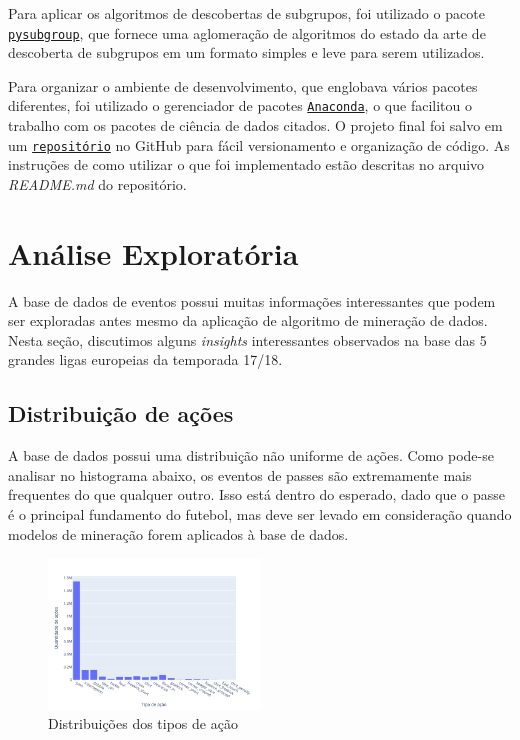\documentclass{article}
\begin{document}
Para aplicar os algoritmos de descobertas de subgrupos, foi utilizado o pacote
\href{https://pysubgroup.readthedocs.io/en/latest/}{\texttt{pysubgroup}}, que
fornece uma aglomeração de algoritmos do estado da arte de descoberta de
subgrupos em um formato simples e leve para serem utilizados.


Para organizar o ambiente de desenvolvimento, que englobava vários pacotes
diferentes, foi utilizado o gerenciador de pacotes
\href{https://www.anaconda.com/}{\texttt{Anaconda}}, o que facilitou o trabalho
com os pacotes de ciência de dados citados. O projeto final foi salvo em um
\href{https://github.com/lframosferreira/projeto-ad}{\texttt{repositório}}
no GitHub para fácil versionamento e organização de código. As instruções de
como
utilizar o que foi implementado estão descritas no arquivo \textit{README.md}
do repositório.

\section{Análise Exploratória}

A base de dados de eventos possui muitas informações interessantes que podem
ser exploradas antes mesmo da aplicação
de algoritmo de mineração de dados. Nesta seção, discutimos alguns
\textit{insights} interessantes observados na base das 5 grandes ligas
europeias da temporada 17/18.

\subsection{Distribuição de ações}

A base de dados possui uma distribuição não uniforme de ações. Como pode-se
analisar no histograma abaixo, os eventos de passes são extremamente mais
frequentes do que qualquer outro. Isso está dentro do esperado, dado que o
passe é o principal fundamento do futebol, mas deve ser levado em consideração
quando modelos de mineração forem aplicados à base de dados.

\begin{figure}[h]
    \centering
    \includegraphics[width=0.5\textwidth]{images/action_distribution.png}
    \caption{Distribuições dos tipos de ação}
    \label{fig:example}
\end{figure}
\end{document}
